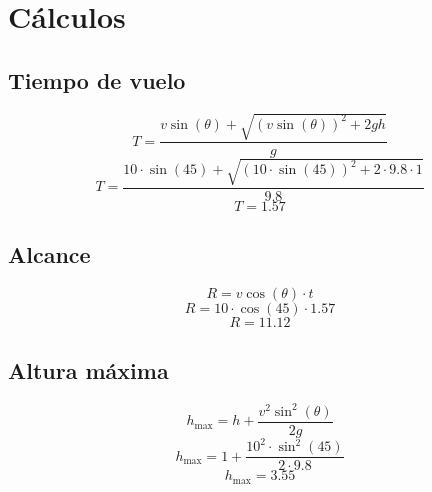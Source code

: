 \documentclass{article}
\begin{document}
\section{Cálculos}
\subsection{Tiempo de vuelo}
\[
T = \frac{v \sin(\theta) + \sqrt{(v \sin(\theta))^2 + 2gh}}{g}
\]
\[
T = \frac{10 \cdot \sin(45) + \sqrt{(10 \cdot \sin(45))^2 + 2 \cdot 9.8 \cdot 1}}{9.8}
\]
\[
T = 1.57
\]
\subsection{Alcance}
\[
R = v \cos(\theta) \cdot t
\]
\[
R = 10 \cdot \cos(45) \cdot 1.57
\]
\[
R = 11.12
\]
\subsection{Altura máxima}
\[
h_{\text{max}} = h + \frac{v^2 \sin^2(\theta)}{2g}
\]
\[
h_{\text{max}} = 1 + \frac{10^2 \cdot \sin^2(45)}{2 \cdot 9.8}
\]
\[
h_{\text{max}} = 3.55
\]
\end{document}
